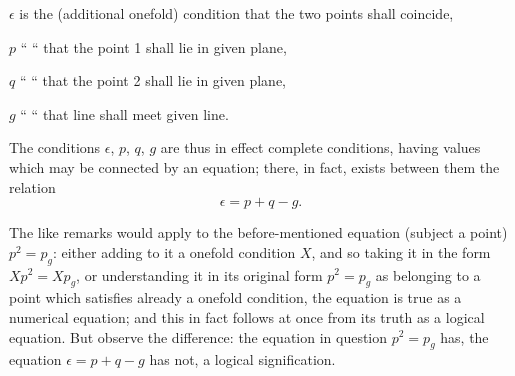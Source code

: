 \documentclass[11pt,a4paper,english]{article}
\theoremstyle{plain}
\begin{document}
\hspace*{2em} $\epsilon$ is the (additional onefold) condition that the two points shall coincide,

\hspace*{2em} $p$ \hspace{3.5em} `` \hspace{3.5em} `` \hspace{3.5em} that the point 1 shall lie in given plane,

\hspace*{2em} $q$ \hspace{3.5em} `` \hspace{3.5em} `` \hspace{3.5em} that the point 2 shall lie in given plane,

\hspace*{2em} $g$ \hspace{3.5em} `` \hspace{3.5em} `` \hspace{3.5em} that line shall meet given line.

The conditions $\epsilon$, $p$, $q$, $g$ are thus in effect complete conditions, having values which may be connected by an equation; there, in fact, exists between them the relation
\[
\epsilon = p + q - g.
\]

The like remarks would apply to the before-mentioned equation (subject a point) $p^2 = p_g$: either adding to it a onefold condition $X$, and so taking it in the form $Xp^2 = Xp_g$, or understanding it in its original form $p^2 = p_g$ as belonging to a point which satisfies already a onefold condition, the equation is true as a numerical equation; and this in fact follows at once from its truth as a logical equation. But observe the difference: the equation in question $p^2 = p_g$ has, the equation $\epsilon = p + q - g$ has not, a logical signification.
\end{document}
